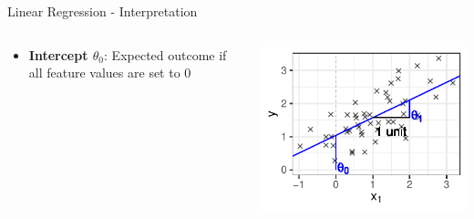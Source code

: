 \documentclass[11pt,compress,t,notes=noshow, aspectratio=169, xcolor=table]{beamer}
\begin{document}
\begin{frame}{Linear Regression - Interpretation}
\begin{columns}[T, totalwidth = \textwidth]
\begin{column}{0.62\textwidth}
\begin{itemize}
        \item<4> \textbf{Intercept $\theta_0$}: Expected outcome if all feature values are set to 0 %
    \end{itemize}
\end{column}
\begin{column}{0.38\textwidth}
        \includegraphics[trim={0 5 0 5},clip, width = \textwidth]{figure/reg_lm_plot_interpreted.pdf}\\
\end{column}
\end{columns}
    
\end{frame}
\end{document}
